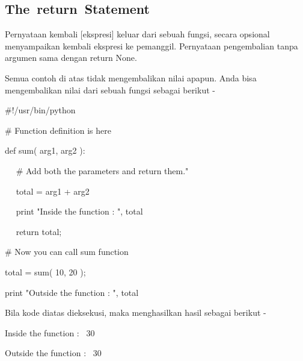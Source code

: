 \documentclass[a4paper,12pt]{report}
\begin{document}
\subsection*{The return Statement}
 \par
\begin{adjustwidth}{0.03in}{0.03in}
Pernyataan kembali [ekspresi] keluar dari sebuah fungsi, secara opsional menyampaikan kembali ekspresi ke pemanggil. Pernyataan pengembalian tanpa argumen sama dengan return None.\end{adjustwidth}
 \par
\begin{adjustwidth}{0.03in}{0.03in}
Semua contoh di atas tidak mengembalikan nilai apapun. Anda bisa mengembalikan nilai dari sebuah fungsi sebagai berikut -\end{adjustwidth}
 \par
\noindent 
 \hspace*{0.5in}  $  \#  $!/usr/bin/python \par
\vspace{12pt}
\noindent 
 \hspace*{0.5in}  $  \#  $ Function definition is here \par
\noindent 
 \hspace*{0.5in} def sum( arg1, arg2 ): \par
\noindent 
 \hspace*{0.5in} ~~  $  \#  $ Add both the parameters and return them." \par
\noindent 
 \hspace*{0.5in} ~~ total = arg1 + arg2 \par
\noindent 
 \hspace*{0.5in} ~~ print "Inside the function : ", total \par
\noindent 
 \hspace*{0.5in} ~~ return total; \par
\vspace{12pt}
\noindent 
 \hspace*{0.5in}  $  \#  $ Now you can call sum function \par
\noindent 
 \hspace*{0.5in} total = sum( 10, 20 ); \par
\noindent 
 \hspace*{0.5in} print "Outside the function : ", total  \par
\begin{adjustwidth}{0.03in}{0.03in}
Bila kode diatas dieksekusi, maka menghasilkan hasil sebagai berikut -\end{adjustwidth}
 \par
\noindent 
 \hspace*{0.5in} Inside the function :~ 30 \par
\noindent 
 \hspace*{0.5in} Outside the function :~ 30 \par
\end{document}
